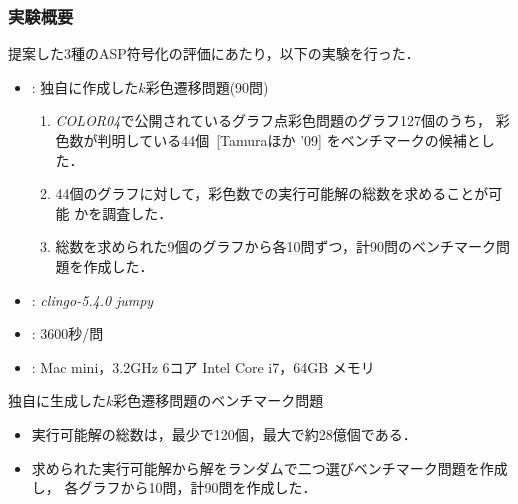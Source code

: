 \documentclass[dvipdfmx,11pt]{beamer}
\begin{document}
\begin{frame}\frametitle{実験概要}
  提案した3種のASP符号化の評価にあたり，以下の実験を行った．
  \bigskip
  \begin{itemize}
    \item {}: 独自に作成した$k$彩色遷移問題(90問)
      \begin{enumerate}
      \item \textit{COLOR04}で公開されているグラフ点彩色問題のグラフ127個のうち，
      彩色数が判明している44個~[Tamuraほか '09] をベンチマークの候補とした．
      \item 44個のグラフに対して，彩色数での実行可能解の総数を求めることが可能
            かを調査した．
      \item 総数を求められた9個のグラフから各10問ずつ，計90問のベンチマーク問題を作成した．
      \end{enumerate}

    \item {}: \textit{clingo-5.4.0} \textit{jumpy}
    \item {}: 3600秒/問
    \item {}: Mac mini，3.2GHz 6コア Intel Core i7，64GB メモリ
  \end{itemize}
  
\end{frame}


\begin{frame}{独自に生成した$k$彩色遷移問題のベンチマーク問題}

  \begin{table}[t]
    \centering
    
  \end{table}

  \begin{itemize}
  \item 実行可能解の総数は，最少で120個，最大で約28億個である．
  \item 求められた実行可能解から解をランダムで二つ選びベンチマーク問題を作成し，
        各グラフから10問，計90問を作成した．
  \end{itemize}

\end{frame}
\end{document}
